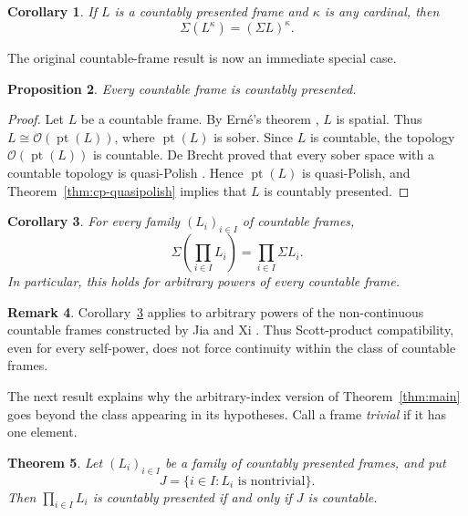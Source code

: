 \documentclass[11pt,reqno]{amsart}
\newtheorem{theorem}{Theorem}[section]
\newtheorem{proposition}[theorem]{Proposition}
\newtheorem{corollary}[theorem]{Corollary}
\theoremstyle{definition}
\newtheorem{remark}[theorem]{Remark}
\numberwithin{equation}{section}
\newcommand{\OO}{\mathcal O}
\newcommand{\pt}{\operatorname{pt}}
\begin{document}
\begin{corollary}\label{cor:self-powers}
If $L$ is a countably presented frame and $\kappa$ is any cardinal, then
\[
  \Sigma(L^\kappa)=(\Sigma L)^\kappa.
\]
\end{corollary}

The original countable-frame result is now an immediate special case.

\begin{proposition}\label{prop:countable-cp}
Every countable frame is countably presented.
\end{proposition}

\begin{proof}
Let $L$ be a countable frame.  By Ern\'e's theorem
\citep[Lemma~1.1(1)]{Erne2019}, $L$ is spatial.  Thus $L\cong\OO(\pt(L))$, where
$\pt(L)$ is sober.  Since $L$ is countable, the topology
$\OO(\pt(L))$ is countable.  De Brecht proved that every sober space with a
countable topology is quasi-Polish \citep[Corollary~6.6]{deBrecht2018}.  Hence $\pt(L)$ is
quasi-Polish, and Theorem~\ref{thm:cp-quasipolish} implies that $L$ is
countably presented.
\end{proof}

\begin{corollary}\label{cor:countable-old}
For every family $(L_i)_{i\in I}$ of countable frames,
\[
  \Sigma\!\left(\prod_{i\in I}L_i\right)
  =\prod_{i\in I}\Sigma L_i.
\]
In particular, this holds for arbitrary powers of every countable frame.
\end{corollary}

\begin{remark}\label{rem:noncontinuous}
Corollary~\ref{cor:countable-old} applies to arbitrary powers of the
non-continuous countable frames constructed by Jia and Xi
\citep{JiaXi2026}.  Thus Scott-product compatibility, even for every
self-power, does not force continuity within the class of countable frames.
\end{remark}


The next result explains why the arbitrary-index version of
Theorem~\ref{thm:main} goes beyond the class appearing in its hypotheses.
Call a frame \emph{trivial} if it has one element.

\begin{theorem}\label{thm:product-cp}
Let $(L_i)_{i\in I}$ be a family of countably presented frames, and put
\[
  J=\{i\in I:L_i\text{ is nontrivial}\}.
\]
Then $\prod_{i\in I}L_i$ is countably presented if and only if $J$ is
countable.
\end{theorem}
\end{document}
